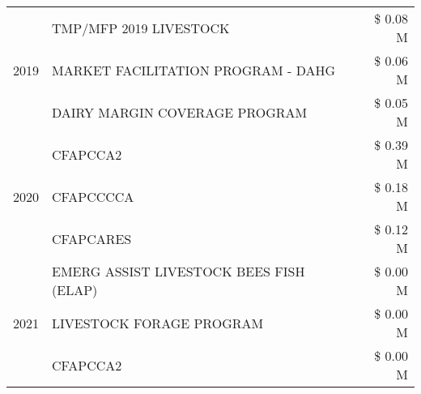 \begin{tabular}{llr}
\cline{1-3}
\multirow[t]{3}{*}{2019} & TMP/MFP 2019 LIVESTOCK & \$ 0.08 M \\
 & MARKET FACILITATION PROGRAM - DAHG & \$ 0.06 M \\
 & DAIRY MARGIN COVERAGE PROGRAM & \$ 0.05 M \\
\cline{1-3}
\multirow[t]{3}{*}{2020} & CFAPCCA2 & \$ 0.39 M \\
 & CFAPCCCCA & \$ 0.18 M \\
 & CFAPCARES & \$ 0.12 M \\
\cline{1-3}
\multirow[t]{3}{*}{2021} & EMERG ASSIST LIVESTOCK BEES FISH (ELAP) & \$ 0.00 M \\
 & LIVESTOCK FORAGE PROGRAM & \$ 0.00 M \\
 & CFAPCCA2 & \$ 0.00 M \\
\cline{1-3}
\bottomrule
\end{tabular}
